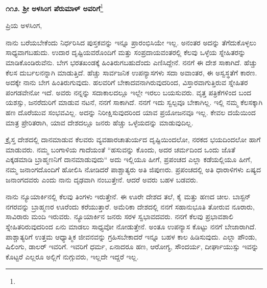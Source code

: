 \begin{center}
\textbf{೧೧೨. ಶ‍್ರೀ ಅಳಸಿಂಗ ಪೆರುಮಾಳ್ ಅವರಿಗೆ}\footnote{}
\end{center}

\vspace{-0.7cm}

\begin{flushright}
{\fontsize{12.5pt}{13pt}\selectfont{ಅಮೆರಿಕಾ\\೨೧ನೇ ಸೆಪ್ಟೆಂಬರ್, ೧೮೯೪}}
\end{flushright}

\vspace{-0.5cm}

\noindent
	ಪ್ರಿಯ ಅಳಸಿಂಗ,

{\fontsize{12.5pt}{13pt}\selectfont{ನಾನು ಬಿಡುವಿಲ್ಲದೆ ಊರಿನಿಂದ ಊರಿಗೆ ಅಲೆಯುತ್ತಾ ಪಾಠಪ್ರವಚನ, ಉಪನ್ಯಾಸಗಳಲ್ಲಿ ನಿರತನಾಗಿರುವೆನು.}}

\newpage

ನಾನು ಬರೆಯಬೇಕೆಂದು ನಿರ್ಧರಿಸಿದ ಪುಸ್ತಕವನ್ನು ಇನ್ನೂ ಪ್ರಾರಂಭಿಸಿಯೇ ಇಲ್ಲ. ಅನಂತರ ಅದನ್ನು ತೆಗೆದುಕೊಳ್ಳಲು ಸಾಧ್ಯವಾಗಬಹುದು. ಉದಾರ ದೃಷ್ಟಿಯವರೊಂದಿಗೆ ಮತ್ತು ಸಂಪ್ರದಾಯವಂತರಲ್ಲಿ ಕೆಲವು ಒಳ್ಳೆಯ ಸ್ನೇಹಿತರನ್ನು ಮಾಡಿಕೊಂಡಿರುವೆನು. ಬೇಗ ಭರತಖಂಡಕ್ಕೆ ಹಿಂತಿರುಗಬಹುದೆಂದು ಎಣಿಸಿದ್ದೇನೆ. ನನಗೆ ಈ ದೇಶ ಸಾಕಾಗಿದೆ. ಹೆಚ್ಚು ಕೆಲಸ ದುರ್ಬಲನನ್ನಾಗಿ ಮಾಡುತ್ತಿದೆ. ಹೆಚ್ಚು ಸಾರ್ವಜನಿಕ ಉಪನ್ಯಾಸಗಳು ಸದಾ ಅವಾಂತರ, ಈ ಅಸ್ವಸ್ಥತೆಗೆ ಕಾರಣ. ಅದಕ್ಕೇ ನಾನು ಬೇಗ ಹಿಂತಿರುಗುವುದು. ಹಲವರಿಗೆ ಬೇಕಾದವನಾಗಿರುವುದರಿಂದ, ವಿಸ್ತಾರವಾಗುತ್ತಿರುವ ಸ್ನೇಹಿತರ ಪಂಗಡವೇನೋ ಇದೆ. ಅವರು ನನ್ನನ್ನು ಸದಾಕಾಲದಲ್ಲೂ ಇಲ್ಲೇ ಇರಲು ಬಯಸುವರು. ವೃತ್ತ ಪತ್ರಿಕೆಗಳಿಂದ ಬಂದ ಯಶಸ್ಸು, ಜನರೆದುರಿಗೆ ಮಾಡುವ ನಟನೆ, ನನಗೆ ಸಾಕಾಗಿದೆ. ನನಗೆ ಇದು ಸ್ವಲ್ಪವೂ ಬೇಕಾಗಿಲ್ಲ. ಇಲ್ಲಿ ನಮ್ಮ ಕೆಲಸಕ್ಕಾಗಿ ಹಣ ದೊರೆಯುವ ಸಂಭವವಿಲ್ಲ. ಅದನ್ನು ನಿರೀಕ್ಷಿಸುವುದರಿಂದ ಯಾವ ಪ್ರಯೋಜನವೂ ಇಲ್ಲ. ಕೇವಲ ದಯೆಯಿಂದ ಮಾತ್ರ ಪ್ರೇರಿತರಾಗಿ, ಯಾವ ದೇಶದಲ್ಲೂ ಜನರು ಹೆಚ್ಚು ಒಳ್ಳೆಯದನ್ನು ಮಾಡುವುದಿಲ್ಲ.

ಕ್ರೈಸ್ತ ದೇಶದಲ್ಲಿ ದಾನಮಾಡುವ ಕೆಲವರು ವ್ಯವಹಾರಚಾತುರ್ಯದ ದೃಷ್ಟಿ\break ಯಿಂದಲೋ, ನರಕದ ಭಯದಿಂದಲೋ ಹಾಗೆ ಮಾಡುವರು. ನಮ್ಮ ಬಂಗಾಳಿಯ ಗಾದೆಯಂತೆ \enginline{-} “ಹಸುವನ್ನು ಕೊಂದು, ಅದರ ಚರ್ಮದಿಂದ ಒಂದು ಜೊತೆ ಎಕ್ಕಡಮಾಡಿ ಬ್ರಾಹ್ಮಣನಿಗೆ ದಾನಮಾಡುವುದು“ \enginline{-} ಅದು ಇಲ್ಲಿಯೂ ಹೀಗೆ, ಪ್ರಪಂಚದ ಎಲ್ಲಾ ಕಡೆಯಲ್ಲಿಯೂ ಹೀಗೆ, ನಮ್ಮ ಜನಾಂಗದೊಂದಿಗೆ ಹೋಲಿಸಿ ನೋಡಿದರೆ ಪಾಶ್ಚಾತ್ಯರು ಅತಿ ಜಿಪುಣರು. ಪ್ರಪಂಚದಲ್ಲಿ ಅತಿ ಧಾರಾಳಿಗಳು ಏಷ್ಯದ ಜನಾಂಗದವರು ಎಂದು ನಾನು ದೃಢವಾಗಿ ನಂಬುತ್ತೇನೆ. ಆದರೆ ಅವರು ಬಹಳ ಬಡವರು.

ನಾನು ನ್ಯೂಯಾರ್ಕಿನಲ್ಲಿ ಕೆಲವು ತಿಂಗಳು ಇರುತ್ತೇನೆ. ಈ ಊರೇ ದೇಶದ ತಲೆ, ಕೈ ಮತ್ತು ಹಣದ ಚೀಲ. ಬಾಸ್ಟನ್ ನಗರವನ್ನು ಬ್ರಾಹ್ಮಣರ ಊರೆಂದು ಕರೆಯುತ್ತಾರೆ. ಅಮೆರಿಕಾ ದೇಶದಲ್ಲಿ ನನಗೆ ಸಹಾನುಭೂತಿ ತೋರುವ ನೂರಾರು, ಸಾವಿರಾರು ಮಂದಿ ಇರುವರು. ನ್ಯೂಯಾರ್ಕಿನ ಜನರು ಸರಳ ಸ್ವಭಾವದವರು. ನನಗೆ ಕೆಲವು ಪ್ರಭಾವಶಾಲಿ ಸ್ನೇಹಿತರಿರುವುದರಿಂದ ಏನು ಮಾಡಲು ಸಾಧ್ಯವೋ ನೋಡುತ್ತೇನೆ. ಅಂತೂ ಉಪನ್ಯಾಸ ಕೊಟ್ಟು ನನಗೆ ಬೇಜಾರಾಗಿದೆ. ಪಾಶ್ಚಾತ್ಯರಿಗೆ ಉತ್ತಮ ಆಧ್ಯಾತ್ಮಿಕ ಜೀವನವನ್ನು ಗ್ರಹಿಸಬೇಕಾದರೆ ಇನ್ನೂ ಬಹಳ ಕಾಲ ಹಿಡಿಸುವುದು. ಎಲ್ಲಾ ಪೌಂಡು, ಷಿಲಿಂಗು, ಡಾಲರ್ ಇವರಿಗೆ. ಇವರಿಗೆ ಧರ್ಮ, ಏನಾದರೂ ಹಣ, ಆರೋಗ್ಯ, ಸೌಂದರ್ಯ, ದೀರ್ಘಾಯುಸ್ಸು ಇವನ್ನು ಕೊಟ್ಟರೆ ಎಲ್ಲರೂ ಅಲ್ಲಿಗೆ ನುಗ್ಗುವರು, ಇಲ್ಲದೇ ಇದ್ದರೆ ಇಲ್ಲ.

